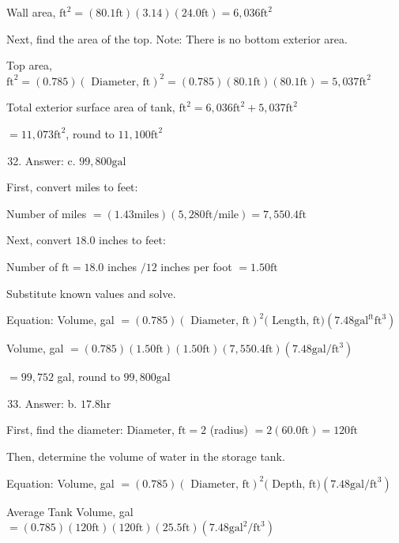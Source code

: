 \documentclass[10pt]{article}
\begin{document}
Wall area, $\mathrm{ft}^{2}=(80.1 \mathrm{ft})(3.14)(24.0 \mathrm{ft})=6,036 \mathrm{ft}^{2}$

Next, find the area of the top. Note: There is no bottom exterior area.

Top area, $\mathrm{ft}^{2}=(0.785)(\text { Diameter, } \mathrm{ft})^{2}=(0.785)(80.1 \mathrm{ft})(80.1 \mathrm{ft})=5,037 \mathrm{ft}^{2}$

Total exterior surface area of tank, $\mathrm{ft}^{2}=6,036 \mathrm{ft}^{2}+5,037 \mathrm{ft}^{2}$

$=11,073 \mathrm{ft}^{2}$, round to $11,100 \mathrm{ft}^{2}$

\begin{enumerate}
  \setcounter{enumi}{31}
  \item Answer: c. $99,800 \mathrm{gal}$
\end{enumerate}

First, convert miles to feet:

Number of miles $=(1.43 \mathrm{miles})(5,280 \mathrm{ft} / \mathrm{mile})=7,550.4 \mathrm{ft}$

Next, convert $18.0$ inches to feet:

Number of $\mathrm{ft}=18.0$ inches $/ 12$ inches per foot $=1.50 \mathrm{ft}$

Substitute known values and solve.

Equation: Volume, gal $=(0.785)(\text { Diameter, } \mathrm{ft})^{2}($ Length, $\mathrm{ft})\left(7.48 \mathrm{gal}^{\mathrm{ft}} \mathrm{ft}^{3}\right)$

Volume, gal $=(0.785)(1.50 \mathrm{ft})(1.50 \mathrm{ft})(7,550.4 \mathrm{ft})\left(7.48 \mathrm{gal} / \mathrm{ft}^{3}\right)$

$=99,752$ gal, round to $99,800 \mathrm{gal}$

\begin{enumerate}
  \setcounter{enumi}{32}
  \item Answer: b. $17.8 \mathrm{hr}$
\end{enumerate}

First, find the diameter: Diameter, $\mathrm{ft}=2$ (radius) $=2(60.0 \mathrm{ft})=120 \mathrm{ft}$

Then, determine the volume of water in the storage tank.

Equation: Volume, gal $=(0.785)(\text { Diameter, } \mathrm{ft})^{2}($ Depth, $\mathrm{ft})\left(7.48 \mathrm{gal} / \mathrm{ft}^{3}\right)$

Average Tank Volume, gal $=(0.785)(120 \mathrm{ft})(120 \mathrm{ft})(25.5 \mathrm{ft})\left(7.48 \mathrm{gal}^{2} / \mathrm{ft}^{3}\right)$
\end{document}

